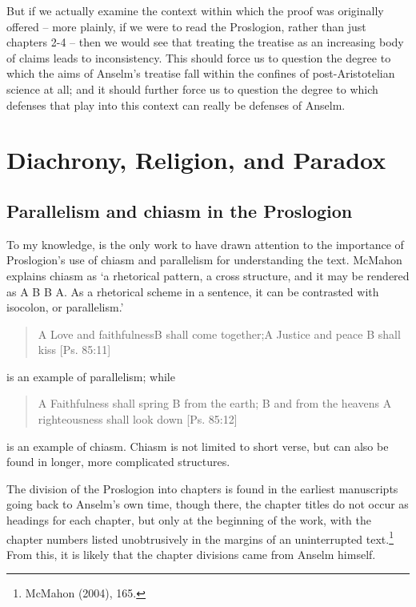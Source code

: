 \documentclass[]{amsart}
\begin{document}
But if we actually examine the context within which the proof was originally offered – more plainly, if we were to read the Proslogion, rather than just chapters 2-4 – then we would see that treating the treatise as an increasing body of claims leads to inconsistency. This should force us to question the degree to which the aims of Anselm's treatise fall within the confines of post-Aristotelian science at all; and it should further force us to question the degree to which defenses that play into this context can really be defenses of Anselm.

\section{Diachrony, Religion, and Paradox}
\subsection{Parallelism and chiasm in the Proslogion}
To my knowledge, \cite{McMahon2004} is the only work to have drawn attention to the importance of Proslogion's use of chiasm and parallelism for understanding the text. McMahon explains chiasm as `a rhetorical pattern, a cross structure, and it may be rendered as A B B A. As a rhetorical scheme in a sentence, it can be contrasted with isocolon, or parallelism.' \cite[36]{McMahon2004} 
\begin{quote}
A Love and faithfulness\newline B \hspace{.3in} shall come together;\newline A Justice and peace \newline B \hspace{.3in} shall kiss [Ps. 85:11]
\end{quote}
is an example of parallelism; while 
\begin{quote}
A Faithfulness shall spring \newline B \hspace{.3in} from the earth; \newline B \hspace {.3in} and from the heavens \newline A righteousness shall look down [Ps. 85:12]
\end{quote}
is an example of chiasm. Chiasm is not limited to short verse, but can also be found in longer, more complicated structures.

The division of the Proslogion into chapters is found in the earliest manuscripts going back to Anselm's own time, though there, the chapter titles do not occur as headings for each chapter, but only at the beginning of the work, with the chapter numbers listed unobtrusively in the margins of an uninterrupted text.\footnote{McMahon (2004), 165.}  From this, it is likely that the chapter divisions came from Anselm himself.
\end{document}
